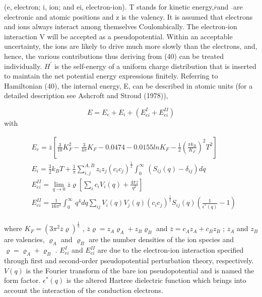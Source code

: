 \documentclass[12pt]{article}
\newcommand*{\1}{\hspace{1pt}}
\begin{document}
(e, electron; i, ion; and ei, electron-ion). T stands for kinetic energy,$\overline{r}$and $\overline{}$are 
electronic and atomic positions and z is the valency. It is assumed that electrons and ions 
always interact among themselves Coulombically. The electron-ion interaction V will be accepted 
as a pseudopotential. Within an acceptable uncertainty, the ions are likely to drive much more 
slowly than the electrons, and, hence, the various contributions thus deriving from (40) can 
be treated individually. $H^{\prime}$  is the self-energy of a uniform charge distribution that is 
inserted to maintain the net potential energy expressions finitely. Referring to Hamiltonian 
(40), the internal energy, E, can be described in atomic units (for a detailed description
see Ashcroft and Stroud (1978)),

    \begin{equation}
       E = E_e + E_i + (E^{I} _{ei} + E^{II} _{ei})
    \end{equation}
with

\begin{align}
    &  E_e =  \overline{z}\left[\frac{3}{10} K^{2} _F - \frac{3}{4\pi} K_F - 0.0474 - 0.0155 
        ln {K_F} - \frac{1}{2}\left(\frac{\pi k_B}{K_F} \right)^{2} T^2 \right] \\
    &  E_i =  \frac{3}{2}k_{B}T + \frac{1}{\pi}\sum_{i , j}^{A , B} z_{i}z_{j}\left(c_{i}c_{j}\right)^{\frac{1}{2}}
        \int_{0}^{\infty}  \,\left(S_{ij}(q) - \delta _{ij}\right) dq \\   
    & E^{II}_{ei} = \lim_{q \to 0} \overline{z}\varrho 
       \left[\sum_{i}^{} c_{i}V_{i}(q) + \frac{4\pi \overline{z}}{q^2} \right]  \\ 
    &  E^{II}_{ei} = \frac{1}{16{\pi}^3}\int_{0}^{\infty}  \,q^{4}dq \sum_{ij}^{} V_{i}(q)V_{j}(q) 
        \left(c_{i}c_{j}\right)^{\frac{1}{2}}S_{ij}(q)\left(\frac{1}{\epsilon^{ \ast}(q)} - 1 \right) 
    \end{align}\\

where $K_F = \left( 3\pi ^{2}\overline{z}\varrho\right)^{\frac{1}{3}}$ , $\overline{z}\varrho = z_{A}\varrho_{A} + z_{B}\varrho_{B}$ and $\overline{z} = c_{A}z_{A} + c_{B}z_{B}$
; $z_A$ and $z_B$ are valencies, $\varrho _A$ and $\varrho _B$ are the number densities of the ion 
species and $\varrho = \varrho _A + \varrho _B $ . $E^{I}_{ei}$ and $E^{II}_{ei}$ are due to
the electron-ion interaction specified through first and second-order pseudopotential 
perturbation
theory, respectively. $V(q)$ is the Fourier transform of the bare ion pseudopotential and is
named the form factor. $\epsilon ^{\ast}(q)$ is the altered Hartree dielectric function which brings into 
account the interaction of the conduction electrons.\\
\end{document}
